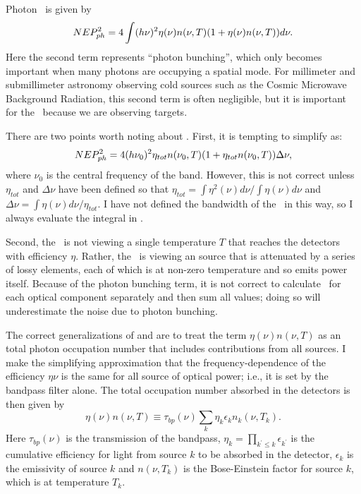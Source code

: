 Photon \NEP\ is given by \cite[Equation~51]{zmuidzinas_thermal_2003}
\begin{equation} \label{eqn:ch4-photon-nep}
  NEP_{ph}^2 = 4 \int (h \nu)^2 \eta(\nu) n(\nu,T) (1 + \eta(\nu) n(\nu,T)) d \nu.
\end{equation}
Here the second term represents ``photon bunching'', which only becomes important when many photons are occupying a spatial mode.
For millimeter and submillimeter astronomy observing cold sources such as the Cosmic Microwave Background Radiation, this second term is often negligible, but it is important for the \Imager\ because we are observing  targets.

There are two points worth noting about .
First, it is tempting to simplify  as:
\begin{equation}
  NEP_{ph}^2 = 4 (h \nu_0)^2 \eta_{tot} n(\nu_0,T) (1 + \eta_{tot} n(\nu_0,T)) \Delta \nu,
\end{equation}
where $\nu_0$ is the central frequency of the band.
However, this is not correct unless $\eta_{tot}$ and $\Delta \nu$ have been defined so that $\eta_{tot} = \int \eta^2(\nu) d\nu / \int \eta(\nu) d\nu$ and $\Delta \nu = \int \eta(\nu) d \nu / \eta_{tot}$.
I have not defined the bandwidth of the \Imager\ in this way, so I always evaluate the integral in .

Second, the \Imager\ is not viewing a single temperature $T$ that reaches the detectors with efficiency $\eta$.
Rather, the \Imager\ is viewing an  source that is attenuated by a series of lossy elements, each of which is at non-zero temperature and so emits power itself.
Because of the photon bunching term, it is not correct to calculate \NEPph\ for each optical component separately and then sum all values; doing so will underestimate the noise due to photon bunching.

The correct generalizations of  and  are to treat the term $\eta(\nu) n(\nu,T)$ as an total photon occupation number that includes contributions from all sources.
I make the simplifying approximation that the frequency-dependence of the efficiency $\eta{\nu}$ is the same for all source of optical power; i.e., it is set by the bandpass filter alone.
The total occupation number absorbed in the detectors is then given by
\begin{equation} \label{eqn:ch4-tot-n0}
  \eta(\nu) n(\nu,T) \equiv \tau_{bp}(\nu) \sum_k \eta_k \epsilon_k n_k(\nu,T_k).
\end{equation}
Here $\tau_{bp}(\nu)$ is the transmission of the bandpass, $\eta_k = \prod_{k^{\prime} \le k} \epsilon_{k^{\prime}}$ is the cumulative efficiency for light from source $k$ to be absorbed in the detector, $\epsilon_k$ is the emissivity of source $k$ and $n(\nu,T_k)$ is the Bose-Einstein factor  for source $k$, which is at temperature $T_k$.

